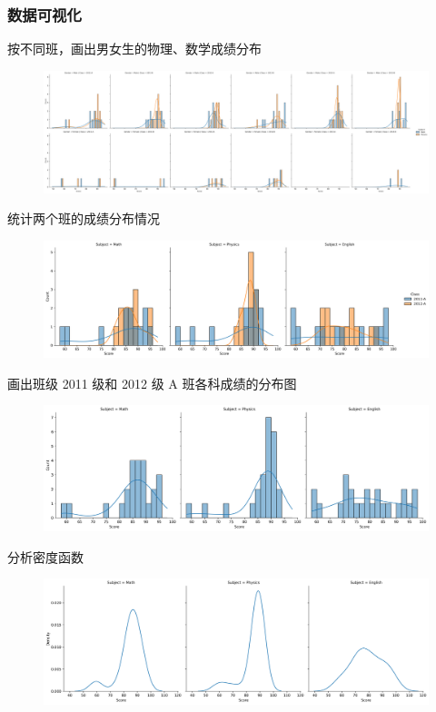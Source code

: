 \documentclass[10pt,a4paper,twoside,UTF8]{ctexart}
\begin{document}
\subsubsection{数据可视化}


按不同班，画出男女生的物理、数学成绩分布
\begin{figure}[H]
	\centering
	\includegraphics[width=\textwidth]{img//Fig.1.1.png}
	\label{fig:1.1}
\end{figure}

统计两个班的成绩分布情况
\begin{figure}[H]
	\centering
	\includegraphics[width=\textwidth]{img//Fig.1.2.png}
	\label{fig:1.2}
\end{figure}

画出班级 2011 级和 2012 级 A 班各科成绩的分布图
\begin{figure}[H]
	\centering
	\includegraphics[width=\textwidth]{img//Fig.1.3.1.png}
	\label{fig:1.3}
\end{figure}

分析密度函数 
\begin{figure}[H]
	\centering
	\includegraphics[width=\textwidth]{img//Fig.1.3.2.png}
	\label{fig:1.4}
\end{figure}
\end{document}
